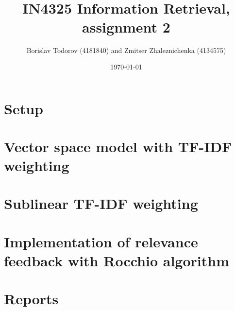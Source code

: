 \documentclass[a4paper, notitlepage]{article}
\begin{document}
\title{IN4325 Information Retrieval, assignment 2}
\author{Borislav Todorov (4181840) and Zmitser Zhaleznichenka (4134575)}
\date{\today}
\maketitle

\section{Setup}

\section{Vector space model with TF-IDF weighting}

\section{Sublinear TF-IDF weighting}

\section{Implementation of relevance feedback with Rocchio algorithm}

\section{Reports}
\end{document}
